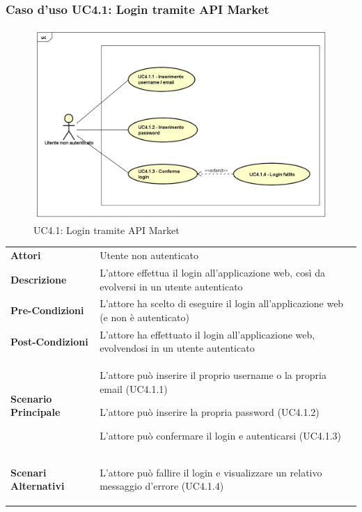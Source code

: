 \newpage
\subsubsection{Caso d'uso UC4.1: Login tramite API Market}
\label{UC4_1}
\begin{figure}[!htbp]
	\centering
	\includegraphics[scale=0.45]{UML/UC4_1.png}
	\caption{UC4.1: Login tramite API Market}
\end{figure}

\begin{tabular}{ l | p{11cm}}
	\hline
	\rowcolor{Gray}
	 \multicolumn{2}{c}{UC4.1 - Login tramite API Market} \\
	 \hline
	\textbf{Attori} & Utente non autenticato \\
	\textbf{Descrizione} & L'attore effettua il login all'applicazione web, così da evolversi in un utente autenticato\\
	\textbf{Pre-Condizioni} & L'attore ha scelto di eseguire il login all'applicazione web (e non è autenticato) \\
	\textbf{Post-Condizioni} & L'attore ha effettuato il login all'applicazione web, evolvendosi in un utente autenticato \\
	\textbf{Scenario Principale} & 
	\begin{enumerate*}[label=(\arabic*.),itemjoin={\newline}]
		\item L'attore può inserire il proprio username o la propria email (UC4.1.1)
		\item L'attore può inserire la propria password (UC4.1.2)
		\item L'attore può confermare il login e autenticarsi (UC4.1.3)
	\end{enumerate*}\\
	\textbf{Scenari Alternativi} & 
	\begin{enumerate*}[label=(\arabic*.),itemjoin={\newline}]
		\item L'attore può fallire il login e visualizzare un relativo messaggio d'errore (UC4.1.4)
	\end{enumerate*}\\
\end{tabular}


